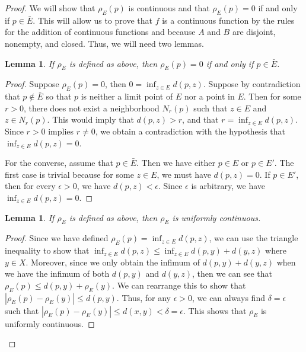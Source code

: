 \documentclass[psamsfonts]{amsart}
\newtheorem{lem}[thm]{Lemma}
\theoremstyle{definition}
\theoremstyle{remark}
\numberwithin{equation}{section}
\begin{document}
\begin{proof}
We will show that $\rho_E(p)$ is continuous and that $\rho_E(p) = 0$ if and only if $p \in \bar{E}$. This will allow us to prove that $f$ is a continuous function by the rules for the addition of continuous functions and because $A$ and $B$ are disjoint, nonempty, and closed. Thus, we will need two lemmas.

\begin{lem}
If $\rho_E$ is defined as above, then $\rho_E(p) = 0$ if and only if $p \in \bar{E}$.
\end{lem}

\begin{proof}
Suppose $\rho_E(p) = 0$, then $0 = \inf_{z \in E} d(p,z)$. Suppose by contradiction that $p \notin \bar{E}$ so that $p$ is neither a limit point of $E$ nor a point in $E$. Then for some $r > 0$, there does not exist a neighborhood $N_r(p)$ such that $z \in E$ and $z \in N_r(p)$. This would imply that $d(p,z) > r$, and that $r = \inf_{z \in E} d(p,z)$. Since $r > 0$ implies $r \neq 0$, we obtain a contradiction with the hypothesis that $\inf_{z \in E} d(p,z) = 0$. 

For the converse, assume that $p \in \bar{E}$. Then we have either $p \in E$ or $p \in E'$. The first case is trivial because for some $z \in E$, we must have $d(p,z) = 0$. If $p \in E'$, then for every $\epsilon >0$, we have $d(p,z) < \epsilon$. Since $\epsilon$ is arbitrary, we have $\inf_{z \in E} d(p,z) = 0$. 
\end{proof}

\begin{lem}
If $\rho_E$ is defined as above, then $\rho_E$ is uniformly continuous.
\end{lem}

\begin{proof}
Since we have defined $\rho_E(p) = \inf_{z \in E} d(p,z)$, we can use the triangle inequality to show that $\inf_{z \in E} d(p,z) \leq \inf_{z \in E} d(p,y) + d(y,z)$ where $y \in X$. Moreover, since we only obtain the infimum of $d(p,y) + d(y,z)$ when we have the infimum of both $d(p,y)$ and $d(y,z)$, then we can see that $\rho_E(p) \leq d(p,y) + \rho_E(y)$. We can rearrange this to show that $|\rho_E(p) - \rho_E(y) | \leq d(p,y)$. Thus, for any $\epsilon > 0$, we can always find $\delta = \epsilon$ such that $|\rho_E(p) - \rho_E(y)| \leq d(x,y) < \delta = \epsilon$. This shows that $\rho_E$ is uniformly continuous.
\end{proof}


\end{proof}
\end{document}
